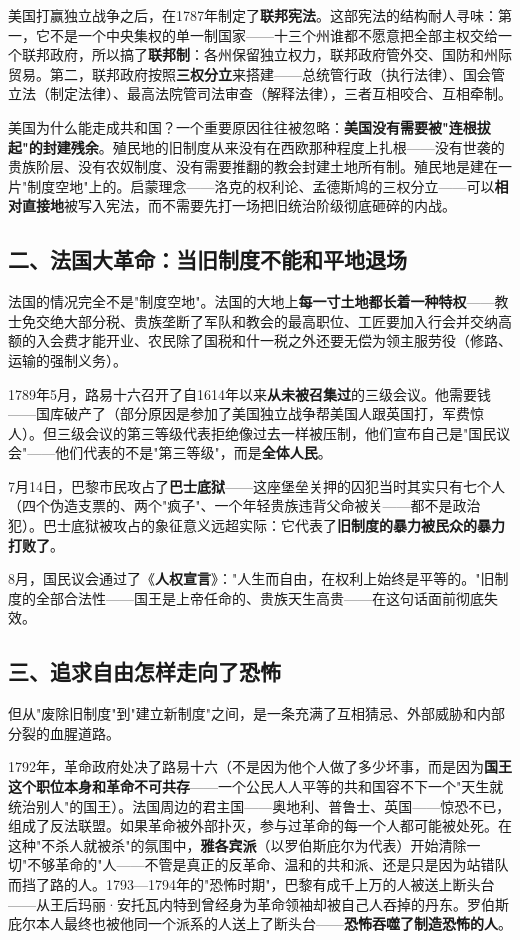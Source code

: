 \documentclass[a4paper,12pt]{ctexart}
\begin{document}
美国打赢独立战争之后，在1787年制定了\textbf{联邦宪法}。这部宪法的结构耐人寻味：第一，它不是一个中央集权的单一制国家——十三个州谁都不愿意把全部主权交给一个联邦政府，所以搞了\textbf{联邦制}：各州保留独立权力，联邦政府管外交、国防和州际贸易。第二，联邦政府按照\textbf{三权分立}来搭建——总统管行政（执行法律）、国会管立法（制定法律）、最高法院管司法审查（解释法律），三者互相咬合、互相牵制。

美国为什么能走成共和国？一个重要原因往往被忽略：\textbf{美国没有需要被"连根拔起"的封建残余}。殖民地的旧制度从来没有在西欧那种程度上扎根——没有世袭的贵族阶层、没有农奴制度、没有需要推翻的教会封建土地所有制。殖民地是建在一片"制度空地"上的。启蒙理念——洛克的权利论、孟德斯鸠的三权分立——可以\textbf{相对直接地}被写入宪法，而不需要先打一场把旧统治阶级彻底砸碎的内战。

\subsection*{二、法国大革命：当旧制度不能和平地退场}

法国的情况完全不是"制度空地"。法国的大地上\textbf{每一寸土地都长着一种特权}——教士免交绝大部分税、贵族垄断了军队和教会的最高职位、工匠要加入行会并交纳高额的入会费才能开业、农民除了国税和什一税之外还要无偿为领主服劳役（修路、运输的强制义务）。

1789年5月，路易十六召开了自1614年以来\textbf{从未被召集过}的三级会议。他需要钱——国库破产了（部分原因是参加了美国独立战争帮美国人跟英国打，军费惊人）。但三级会议的第三等级代表拒绝像过去一样被压制，他们宣布自己是"国民议会"——他们代表的不是"第三等级"，而是\textbf{全体人民}。

7月14日，巴黎市民攻占了\textbf{巴士底狱}——这座堡垒关押的囚犯当时其实只有七个人（四个伪造支票的、两个"疯子"、一个年轻贵族违背父命被关——都不是政治犯）。巴士底狱被攻占的象征意义远超实际：它代表了\textbf{旧制度的暴力被民众的暴力打败了}。

8月，国民议会通过了《\textbf{人权宣言}》："人生而自由，在权利上始终是平等的。"旧制度的全部合法性——国王是上帝任命的、贵族天生高贵——在这句话面前彻底失效。

\subsection*{三、追求自由怎样走向了恐怖}

但从"废除旧制度"到"建立新制度"之间，是一条充满了互相猜忌、外部威胁和内部分裂的血腥道路。

1792年，革命政府处决了路易十六（不是因为他个人做了多少坏事，而是因为\textbf{国王这个职位本身和革命不可共存}——一个公民人人平等的共和国容不下一个"天生就统治别人"的国王）。法国周边的君主国——奥地利、普鲁士、英国——惊恐不已，组成了反法联盟。如果革命被外部扑灭，参与过革命的每一个人都可能被处死。在这种"不杀人就被杀"的氛围中，\textbf{雅各宾派}（以罗伯斯庇尔为代表）开始清除一切"不够革命的"人——不管是真正的反革命、温和的共和派、还是只是因为站错队而挡了路的人。1793—1794年的"恐怖时期"，巴黎有成千上万的人被送上断头台——从王后玛丽·安托瓦内特到曾经身为革命领袖却被自己人吞掉的丹东。罗伯斯庇尔本人最终也被他同一个派系的人送上了断头台——\textbf{恐怖吞噬了制造恐怖的人}。
\end{document}
